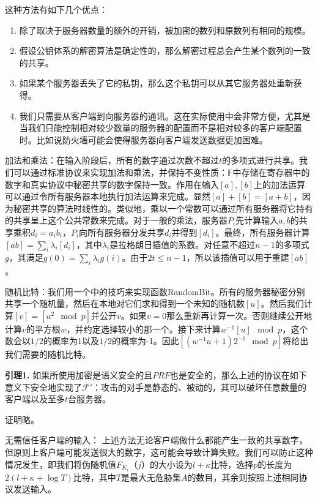 这种方法有如下几个优点：
\begin{enumerate}
	\item 除了取决于服务器数量的额外的开销，被加密的数列和原数列有相同的规模。
	\item 假设公钥体系的解密算法是确定性的，那么解密过程总会产生某个数列的一致的共享。
	\item 如果某个服务器丢失了它的私钥，那么这个私钥可以从其它服务器处重新获得。
	\item 我们只需要从客户端到向服务器的通讯。这在实际使用中会非常方便，尤其是当我们只能控制相对较少数量的服务器的配置而不是相对较多的客户端配置时。比如说防火墙可能会使得服务器向客户端发送数据更加困难。
\end{enumerate}

{\heiti 加法和乘法：}在输入阶段后，所有的数字通过次数不超过$t$的多项式进行共享。我们可以通过标准协议来实现加法和乘法，并保持不变性质：$\mathbb{F}$中存储在寄存器中的数字和真实协议中秘密共享的数字保持一致。作用在输入$[a],[b]$上的加法运算可以通过令所有服务器本地执行加法运算来完成。显然$[a]+[b]=[a+b]$，因为秘密共享的算法时线性的。类似地，乘以一个常数可以通过所有服务器将它持有的共享呈上这个公共常数来完成。对于一般的乘法，服务器$P_i$先计算输入$a,b$的共享乘积$d_i=a_ib_i$，$P_i$向所有服务器分发共享$d_i$并得到$[d_i]$。最终，所有服务器计算$[ab]=\sum_i \lambda_i[d_i]$，其中$\lambda_i$是拉格朗日插值的系数。对任意不超过$n-1$的多项式$g$，其满足$g(0)=\sum_i \lambda_ig(i)$。由于$2t\leq n-1$，所以该插值可以用于重建$[ab]$。

{\heiti 随机比特：}我们用一个中的技巧来实现函数RandomBit。所有的服务器秘密分别共享一个随机量，然后在本地对它们求和得到一个未知的随机数$[u]$。然后我们计算$[v]=[u^2\mod p]$并公开$v$。如果$v=0$那么重新再计算一次。否则继续公开地计算$v$的平方根$w$，并约定选择较小的那一个。接下来计算$w^{-1}[u]\mod p$，这个数会以$1/2$的概率为1以及$1/2$的概率为-1。因此$[(w^{-1}u+1)2^{-1}\mod p]$将给出我们需要的随机比特。
\newline

\noindent\textbf{引理1.} 如果所使用加密是语义安全的且$PRF$也是安全的，那么上述的协议在如下意义下安全地实现了$\mathcal{F}'$：攻击的对手是静态的、被动的，其可以破坏任意数量的客户端以及至多$t$台服务器。

证明略。
\newline

{\heiti 无需信任客户端的输入：} 上述方法无论客户端做什么都能产生一致的共享数字，但原则上客户端可能发送很大的数字，这可能会导致计算失败。我们可以防止这种情况发生，即我们将伪随机值$F_{K_i}（j）$的大小设为$l+\kappa$比特，选择$p$的长度为$2(l+\kappa+\log T)$比特，其中$T$是最大无危胁集$A$的数目，其余则按照上述相同协议发送输入。

